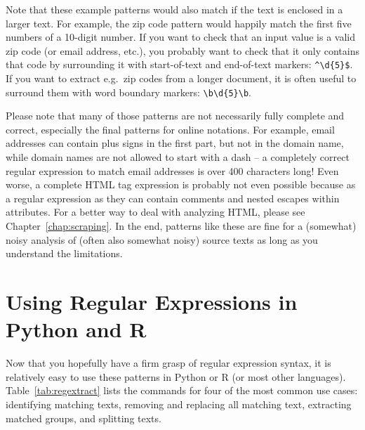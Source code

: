 Note that these example patterns would also match if the text is enclosed in a larger text.
For example, the zip code pattern would happily match the first five numbers of a 10-digit number.
If you want to check that an input value is a valid zip code (or email address, etc.),
you probably want to check that it only contains that code by surrounding it with start-of-text and end-of-text markers: \verb|^\d{5}$|.
If you want to extract e.g.\ zip codes from a longer document, it is often useful to surround them with word boundary markers: \verb|\b\d{5}\b|.

Please note that many of those patterns are not necessarily fully complete and correct, especially the final patterns for online notations.
For example, email addresses can contain plus signs in the first part, but not in the domain name, while domain names are not allowed to start with a dash -- a completely correct regular expression to match email addresses is over 400 characters long!
Even worse, a complete HTML tag expression is probably not even possible because as a regular expression as they can contain comments and nested escapes within attributes.
For a better way to deal with analyzing HTML, please see Chapter~\ref{chap:scraping}. In the end, patterns like these are fine for a (somewhat) noisy analysis of (often also somewhat noisy) source texts as long as you understand the limitations.

\section{Using Regular Expressions in Python and R}\label{sec:regextract}

Now that you hopefully have a firm grasp of regular expression syntax,
it is relatively easy to use these patterns in Python or R (or most other languages).
Table~\ref{tab:regextract} lists the commands for four of the most common use cases:
identifying matching texts, removing and replacing all matching text, extracting matched groups, and splitting texts.

%

